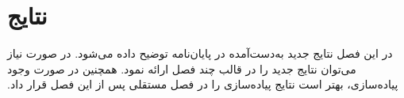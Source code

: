 \chapter{نتایج}

‫در این فصل نتایج جدید به‌دست‌آمده در پایان‌نامه توضیح داده می‌شود.
‫در صورت نیاز می‌توان نتایج جدید را در قالب چند فصل ارائه نمود.
‫همچنین در صورت وجود پیاده‌سازی، بهتر است نتایج پیاده‌سازی را 
‫در فصل مستقلی پس از این فصل قرار داد.
‫